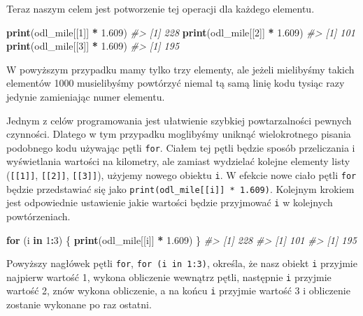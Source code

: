 \documentclass[paper=6in:9in,pagesize=pdftex,headinclude=on,footinclude=on,10pt]{scrbook}
\newenvironment{Shaded}{\begin{snugshade}}{\end{snugshade}}
\newcommand{\CommentTok}[1]{\textcolor[rgb]{0.56,0.35,0.01}{\textit{#1}}}
\newcommand{\ControlFlowTok}[1]{\textcolor[rgb]{0.13,0.29,0.53}{\textbf{#1}}}
\newcommand{\DecValTok}[1]{\textcolor[rgb]{0.00,0.00,0.81}{#1}}
\newcommand{\FloatTok}[1]{\textcolor[rgb]{0.00,0.00,0.81}{#1}}
\newcommand{\KeywordTok}[1]{\textcolor[rgb]{0.13,0.29,0.53}{\textbf{#1}}}
\newcommand{\NormalTok}[1]{#1}
\newcommand{\OperatorTok}[1]{\textcolor[rgb]{0.81,0.36,0.00}{\textbf{#1}}}
\newcommand{\StringTok}[1]{\textcolor[rgb]{0.31,0.60,0.02}{#1}}
\begin{document}
Teraz naszym celem jest potworzenie tej operacji dla każdego elementu.

\begin{Shaded}
\begin{Highlighting}[]
\KeywordTok{print}\NormalTok{(odl_mile[[}\DecValTok{1}\NormalTok{]] }\OperatorTok{*}\StringTok{ }\FloatTok{1.609}\NormalTok{)}
\CommentTok{#> [1] 228}
\KeywordTok{print}\NormalTok{(odl_mile[[}\DecValTok{2}\NormalTok{]] }\OperatorTok{*}\StringTok{ }\FloatTok{1.609}\NormalTok{)}
\CommentTok{#> [1] 101}
\KeywordTok{print}\NormalTok{(odl_mile[[}\DecValTok{3}\NormalTok{]] }\OperatorTok{*}\StringTok{ }\FloatTok{1.609}\NormalTok{)}
\CommentTok{#> [1] 195}
\end{Highlighting}
\end{Shaded}

W powyższym przypadku mamy tylko trzy elementy, ale jeżeli mielibyśmy takich elementów 1000 musielibyśmy powtórzyć niemal tą samą linię kodu tysiąc razy jedynie zamieniając numer elementu.

Jednym z celów programowania jest ułatwienie szybkiej powtarzalności pewnych czynności.
Dlatego w tym przypadku moglibyśmy uniknąć wielokrotnego pisania podobnego kodu używając pętli \texttt{for}.
Ciałem tej pętli będzie sposób przeliczania i wyświetlania wartości na kilometry, ale zamiast wydzielać kolejne elementy listy (\texttt{{[}{[}1{]}{]}}, \texttt{{[}{[}2{]}{]}}, \texttt{{[}{[}3{]}{]}}), użyjemy nowego obiektu \texttt{i}.
W efekcie nowe ciało pętli \texttt{for} będzie przedstawiać się jako \texttt{print(odl\_mile{[}{[}i{]}{]}\ *\ 1.609)}.
Kolejnym krokiem jest odpowiednie ustawienie jakie wartości będzie przyjmować \texttt{i} w kolejnych powtórzeniach.

\begin{Shaded}
\begin{Highlighting}[]
\ControlFlowTok{for}\NormalTok{ (i }\ControlFlowTok{in} \DecValTok{1}\OperatorTok{:}\DecValTok{3}\NormalTok{) \{}
  \KeywordTok{print}\NormalTok{(odl_mile[[i]] }\OperatorTok{*}\StringTok{ }\FloatTok{1.609}\NormalTok{)}
\NormalTok{\}}
\CommentTok{#> [1] 228}
\CommentTok{#> [1] 101}
\CommentTok{#> [1] 195}
\end{Highlighting}
\end{Shaded}

Powyższy nagłówek pętli \texttt{for}, \texttt{for\ (i\ in\ 1:3)}, określa, że nasz obiekt \texttt{i} przyjmie najpierw wartość 1, wykona obliczenie wewnątrz pętli, następnie \texttt{i} przyjmie wartość 2, znów wykona obliczenie, a na końcu \texttt{i} przyjmie wartość 3 i obliczenie zostanie wykonane po raz ostatni.
\end{document}
